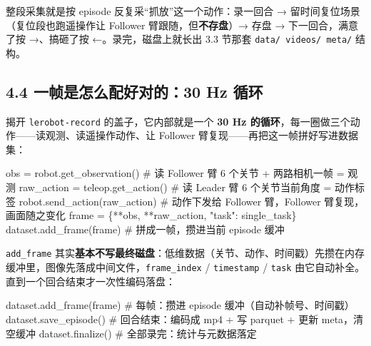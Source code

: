 \documentclass[
  chinese,
]{ctexart}
\newenvironment{Shaded}{\begin{snugshade}}{\end{snugshade}}
\newcommand{\CommentTok}[1]{\textcolor[rgb]{0.37,0.37,0.37}{#1}}
\newcommand{\NormalTok}[1]{\textcolor[rgb]{0.00,0.23,0.31}{#1}}
\newcommand{\OperatorTok}[1]{\textcolor[rgb]{0.37,0.37,0.37}{#1}}
\newcommand{\StringTok}[1]{\textcolor[rgb]{0.13,0.47,0.30}{#1}}
\begin{document}
整段采集就是按 episode 反复采``抓放''这一个动作：录一回合 →
留时间复位场景（复位段也跑遥操作让 Follower 臂跟随，但\textbf{不存盘}）→
存盘 → 下一回合，满意了按 →、搞砸了按 ←。录完，磁盘上就长出 3.3 节那套
\texttt{data/\ videos/\ meta/} 结构。

\subsection{4.4 一帧是怎么配好对的：30 Hz
循环}\label{ux4e00ux5e27ux662fux600eux4e48ux914dux597dux5bf9ux768430-hz-ux5faaux73af}

揭开 \texttt{lerobot-record} 的盖子，它内部就是一个 \textbf{30 Hz
的循环}，每一圈做三个动作------读观测、读遥操作动作、让 Follower
臂复现------再把这一帧拼好写进数据集：

\begin{Shaded}
\begin{Highlighting}[]
\NormalTok{obs }\OperatorTok{=}\NormalTok{ robot.get\_observation()           }\CommentTok{\# 读 Follower 臂 6 个关节 + 两路相机一帧 = 观测}
\NormalTok{raw\_action }\OperatorTok{=}\NormalTok{ teleop.get\_action()        }\CommentTok{\# 读 Leader 臂 6 个关节当前角度 = 动作标签}
\NormalTok{robot.send\_action(raw\_action)           }\CommentTok{\# 动作下发给 Follower 臂，Follower 臂复现，画面随之变化}
\NormalTok{frame }\OperatorTok{=}\NormalTok{ \{}\OperatorTok{**}\NormalTok{obs, }\OperatorTok{**}\NormalTok{raw\_action, }\StringTok{"task"}\NormalTok{: single\_task\}}
\NormalTok{dataset.add\_frame(frame)                }\CommentTok{\# 拼成一帧，攒进当前 episode 缓冲}
\end{Highlighting}
\end{Shaded}

\texttt{add\_frame}
其实\textbf{基本不写最终磁盘}：低维数据（关节、动作、时间戳）先攒在内存缓冲里，图像先落成中间文件，\texttt{frame\_index}
/ \texttt{timestamp} / \texttt{task}
由它自动补全。直到一个回合结束才一次性编码落盘：

\begin{Shaded}
\begin{Highlighting}[]
\NormalTok{dataset.add\_frame(frame)    }\CommentTok{\# 每帧：攒进 episode 缓冲（自动补帧号、时间戳）}
\NormalTok{dataset.save\_episode()      }\CommentTok{\# 回合结束：编码成 mp4 + 写 parquet + 更新 meta，清空缓冲}
\NormalTok{dataset.finalize()          }\CommentTok{\# 全部录完：统计与元数据落定}
\end{Highlighting}
\end{Shaded}
\end{document}
